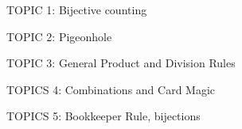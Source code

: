 \documentclass[handout]{mcs}
\begin{document}
\renewcommand{\reading}{
}



\begin{staffnotes}
TOPIC 1: Bijective counting
\end{staffnotes}

\begin{staffnotes}
TOPIC 2: Pigeonhole
\end{staffnotes}

\begin{staffnotes}
TOPIC 3: General Product and Division Rules 
\end{staffnotes}

\begin{staffnotes}
TOPICS 4: Combinations and Card Magic
\end{staffnotes}

\begin{staffnotes}
TOPICS 5: Bookkeeper Rule, bijections
\end{staffnotes}

\end{document}
